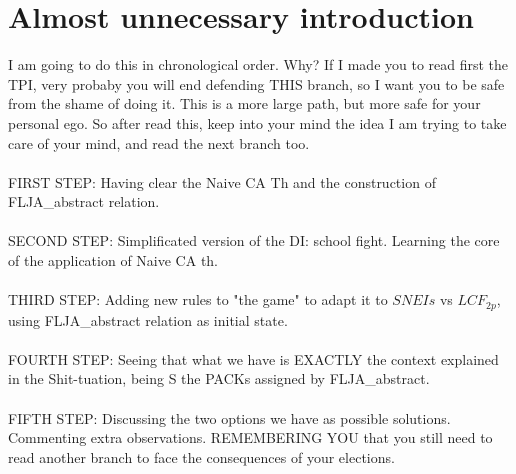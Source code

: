 \chapter{Almost unnecessary introduction}

	\noindent
	 I am going to do this in chronological order. Why? If I made you to read first the TPI, very probaby you will end defending THIS branch, so I want you to be safe from the shame of doing it. This is a more large path, but more safe for your personal ego. So after read this, keep into your mind the idea I am trying to take care of your mind, and read the next branch too.
	\\\\
	
	
	\noindent
	FIRST STEP: Having clear the Naive CA Th and the construction of FLJA\_abstract relation.
	\\\\
	
	\noindent
	SECOND STEP: Simplificated version of the DI: school fight. Learning the core of the application of Naive CA th.
	\\\\
	
	\noindent
	THIRD STEP: Adding new rules to "the game" to adapt it to $SNEIs$ vs $LCF_{2p}$, using FLJA\_abstract relation as initial state.
	\\\\
	
	\noindent
	FOURTH STEP: Seeing that what we have is EXACTLY the context explained in the Shit-tuation, being S the PACKs assigned by FLJA\_abstract.
	\\\\
	
	\noindent
	FIFTH STEP: Discussing the two options we have as possible solutions. Commenting extra observations. REMEMBERING YOU that you still need to read another branch to face the consequences of your elections. 
